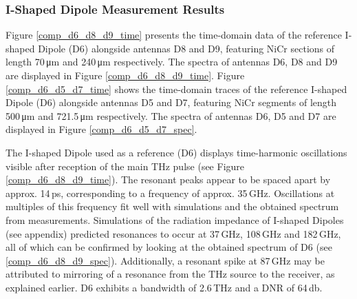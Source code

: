 \subsubsection{I-Shaped Dipole Measurement Results}


Figure \ref{comp_d6_d8_d9_time} presents the time-domain data of the reference I-shaped Dipole (D6) alongside antennas D8 and D9, featuring NiCr sections of length \num{70}\,\si{\micro \meter} and \num{240}\,\si{\micro \meter} respectively. The spectra of antennas D6, D8 and D9 are displayed in Figure \ref{comp_d6_d8_d9_time}. Figure \ref{comp_d6_d5_d7_time} shows the time-domain traces of the reference I-shaped Dipole (D6) alongside antennas D5 and D7, featuring NiCr segments of length \num{500}\,\si{\micro \meter} and \num{721.5}\,\si{\micro \meter} respectively. The spectra of antennas D6, D5 and D7 are displayed in Figure \ref{comp_d6_d5_d7_spec}.

The I-shaped Dipole used as a reference (D6) displays time-harmonic oscillations visible after reception of the main THz pulse (see Figure \ref{comp_d6_d8_d9_time}). The resonant peaks appear to be spaced apart by approx. \num{14}\,\si{\pico \s}, corresponding to a frequency of approx. \num{35}\,\si{\giga \hertz}. Oscillations at multiples of this frequency fit well with simulations and the obtained spectrum from measurements. Simulations of the radiation impedance of I-shaped Dipoles (see appendix) predicted resonances to occur at \num{37}\,\si{\giga \hertz}, \num{108}\,\si{\giga \hertz} and \num{182}\,\si{\giga \hertz}, all of which can be confirmed by looking at the obtained spectrum of D6 (see \ref{comp_d6_d8_d9_spec}). Additionally, a resonant spike at \num{87}\,\si{\giga \hertz} may be attributed to mirroring of a resonance from the THz source to the receiver, as explained earlier. D6 exhibits a bandwidth of \num{2.6}\,\si{\tera \hertz} and a DNR of \num{64}\,\si{\decibel}. 

